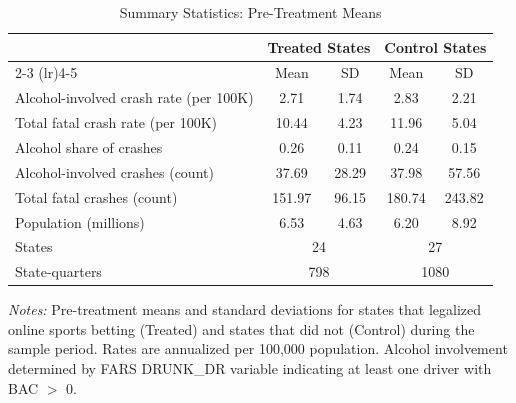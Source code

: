 \begin{table}[t]
\centering
\caption{Summary Statistics: Pre-Treatment Means}
\label{tab:summary}
\footnotesize
\begin{tabular}{lcccc}
\hline\hline
 & \multicolumn{2}{c}{Treated States} & \multicolumn{2}{c}{Control States} \\
\cmidrule(lr){2-3} \cmidrule(lr){4-5}
 & Mean & SD & Mean & SD \\
\hline
Alcohol-involved crash rate (per 100K) & 2.71 & 1.74 & 2.83 & 2.21 \\
Total fatal crash rate (per 100K) & 10.44 & 4.23 & 11.96 & 5.04 \\
Alcohol share of crashes & 0.26 & 0.11 & 0.24 & 0.15 \\
Alcohol-involved crashes (count) & 37.69 & 28.29 & 37.98 & 57.56 \\
Total fatal crashes (count) & 151.97 & 96.15 & 180.74 & 243.82 \\
Population (millions) & 6.53 & 4.63 & 6.20 & 8.92 \\
\hline
States & \multicolumn{2}{c}{24} & \multicolumn{2}{c}{27} \\
State-quarters & \multicolumn{2}{c}{798} & \multicolumn{2}{c}{1080} \\
\hline\hline
\end{tabular}
\begin{tablenotes}
\item \textit{Notes:} Pre-treatment means and standard deviations for states that legalized online sports betting (Treated) and states that did not (Control) during the sample period. Rates are annualized per 100,000 population. Alcohol involvement determined by FARS DRUNK\_DR variable indicating at least one driver with BAC $>$ 0.
\end{tablenotes}
\end{table}
